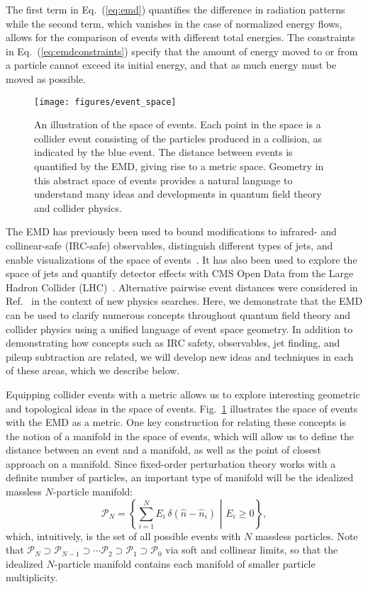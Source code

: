 \documentclass[letterpaper,11pt]{article}
\DeclareRobustCommand{\Fig}[1]{Fig.~\ref{#1}}
\DeclareRobustCommand{\Eq}[1]{Eq.~(\ref{#1})}
\DeclareRobustCommand{\Ref}[1]{Ref.~\cite{#1}}
\begin{document}
%
The first term in \Eq{eq:emd} quantifies the difference in radiation patterns while the second term, which vanishes in the case of normalized energy flows, allows for the comparison of events with different total energies.
%
The constraints in \Eq{eq:emdconstraints} specify that the amount of energy moved to or from a particle cannot exceed its initial energy, and that as much energy must be moved as possible.


\begin{figure}[t]
\centering
\texttt{[image: figures/event\_space]}
\caption{\label{fig:event_space} An illustration of the space of events.
%
Each point in the space is a collider event consisting of the particles produced in a collision, as indicated by the blue event.
%
The distance between events is quantified by the EMD, giving rise to a metric space.
%
Geometry in this abstract space of events provides a natural language to understand many ideas and developments in quantum field theory and collider physics.}
\end{figure}


The EMD has previously been used to bound modifications to infrared- and collinear-safe (IRC-safe) observables, distinguish different types of jets, and enable visualizations of the space of events~\cite{Komiske:2019fks}.
%
It has also been used to explore the space of jets and quantify detector effects with CMS Open Data from the Large Hadron Collider (LHC)~\cite{Komiske:2019jim}.
%
Alternative pairwise event distances were considered in \Ref{Mullin:2019mmh} in the context of new physics searches.
%
Here, we demonstrate that the EMD can be used to clarify numerous concepts throughout quantum field theory and collider physics using a unified language of event space geometry.
%
In addition to demonstrating how concepts such as IRC safety, observables, jet finding, and pileup subtraction are related, we will develop new ideas and techniques in each of these areas, which we describe below.


Equipping collider events with a metric allows us to explore interesting geometric and topological ideas in the space of events.
%
\Fig{fig:event_space} illustrates the space of events with the EMD as a metric.
%
One key construction for relating these concepts is the notion of a manifold in the space of events, which will allow us to define the distance between an event and a manifold, as well as the point of closest approach on a manifold.
%
Since fixed-order perturbation theory works with a definite number of particles, an important type of manifold will be the idealized massless $N$-particle manifold:
%
\begin{equation}
\label{eq:npmanifold}
\mathcal P_N = \left\{\left.\sum_{i=1}^N E_i\, \delta(\hat n - \hat n_i)\,\, \right| \,\, E_i\ge0 \right\},
\end{equation}
%
which, intuitively, is the set of all possible events with $N$ massless particles.
%
Note that $\mathcal P_N\supset\mathcal P_{N-1}\supset\cdots\mathcal P_2\supset \mathcal P_1\supset\mathcal P_0$ via soft and collinear limits, so that the idealized $N$-particle manifold contains each manifold of smaller particle multiplicity.
\end{document}

